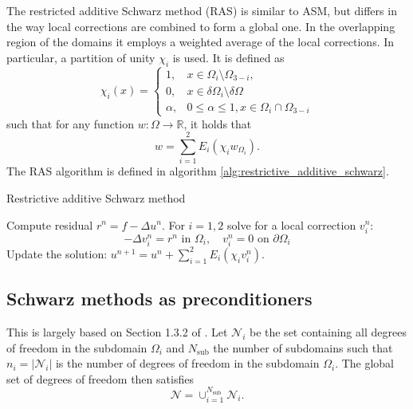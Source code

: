 The restricted additive Schwarz method (RAS) is similar to ASM, but differs in the way local corrections are combined to form a global one. In the overlapping region of the domains it employs a weighted average of the local corrections. In particular, a partition of unity $\chi_i$ is used. It is defined as
\[
  \chi_i(x)=
  \begin{cases}
    1,      & x \in \Omega_i \setminus \Omega_{3-i},                 \\
    0,      & x \in \delta \Omega_i \setminus \delta \Omega          \\
    \alpha, & 0 \leq \alpha \leq 1, x \in \Omega_i \cap \Omega_{3-i}
  \end{cases}
\]
such that for any function $w: \Omega \rightarrow \mathbb{R}$, it holds that
\[
  w = \sum_{i=1}^{2}E_i(\chi_i w_{\Omega_i}).
\]
The RAS algorithm is defined in algorithm \ref{alg:restrictive_additive_schwarz}.
\begin{algorithm}[H]
  \caption{Restrictive additive Schwarz method \cite[Algorithm 1.1]{schwarz_methods_Dolean_2015}}
  \label{alg:restrictive_additive_schwarz}
  \begin{algorithmic}
    \State Compute residual $r^n=f-\Delta u^n$.
    \State For $i=1,2$ solve for a local correction $v_i^n$:
    \[
      -\Delta v_i^n=r^n \text{ in } \Omega_i, \quad v_i^n=0 \text{ on } \partial \Omega_i
    \]
    \State Update the solution: $u^{n+1}=u^n + \sum_{i=1}^{2}E_i(\chi_i v_i^n)$.
  \end{algorithmic}
\end{algorithm}

\subsection{Schwarz methods as preconditioners}\label{sec:schwarz_preconditioners}
This is largely based on Section 1.3.2 of \cite{schwarz_methods_Dolean_2015}. Let  $\mathcal{N}_i$ be the set containing all degrees of freedom in the subdomain $\Omega_i$ and $N_{\text{sub}}$ the number of subdomains such that $n_i = |\mathcal{N}_i|$ is the number of degrees of freedom in the subdomain $\Omega_i$. The global set of degrees of freedom then satisfies
\[
  \mathcal{N}=\cup_{i=1}^{N_{\text{sub}}} \mathcal{N}_i.
\]

